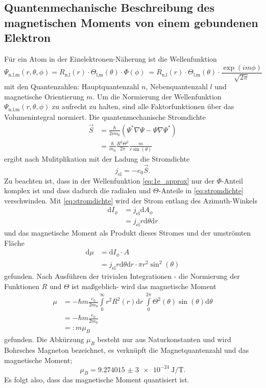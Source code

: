 \subsection{Quantenmechanische Beschreibung des magnetischen Moments von einem gebundenen Elektron}
Für ein Atom in der Einelektronen-Näherung ist die Wellenfunktion
\begin{equation}
  \Psi_\text{n,l,m}(r,\theta,\phi) = R_\text{n,l}(r)\cdot \Theta_\text{l,m}(\theta)\cdot \Phi(\phi) \
  = R_\text{n,l}(r)\cdot \Theta_\text{l,m}(\theta)\cdot \frac{\exp\left(im\phi\right)}{\sqrt{2\pi}}
  \label{eq:1e_approx}
\end{equation}
mit den Quantenzahlen: Hauptquantenzahl $n$, Nebenquantenzahl $l$ und
magnetische Orientierung $m$.
Um die Normierung der Wellenfunktion $\Psi_\text{n,l,m}(r,\theta,\phi)$ zu aufrecht zu halten,
sind alle Faktorfunktionen über das Volumenintegral normiert.
Die quantenmechanische Stromdichte
\begin{align}
  \vec{S}&=\frac{\hbar}{2im_0}(\Psi^{*}\nabla\Psi - \Psi\nabla\Psi^{*})\\
          &=\frac{\hbar}{m_0}\frac{R^2\Theta^2}{2\pi}\frac{m}{r\sin(\theta)}
        \label{eq:stromdichte}
\end{align}
ergibt nach Mulitplikation mit der Ladung die Stromdichte
\begin{equation}
  j_\text{el}= - e_0 \vec{S}.
  \label{eq:stromdichte2}
\end{equation}
Zu beachten ist, dass in der Wellenfunktion \eqref{eq:1e_approx} nur der $\Phi$-Anteil
komplex ist und dass dadurch die radialen und $\Theta$-Anteile in \eqref{eq:stromdichte}
verschwinden.
Mit \eqref{eq:stromdichte} wird der Strom entlang des Azimuth-Winkels
\begin{align}
  \mathup{d}I_\phi &= j_\text{el} \mathup{d}A_\phi\\
          &= j_\text{el} r \mathup{d}\theta \mathup{d}r
\end{align}
und das magnetische Moment als Produkt dieses Stromes und der umströmten Fläche
\begin{align}
  \mathup{d}\mu&=\mathup{d}I_\phi \cdot A\\
            &=j_\text{el} r \mathup{d}\theta \mathup{d}r \cdot \pi r^2\sin^2(\theta)
\end{align}
gefunden.
Nach Ausführen der trivialen Integrationen - die Normierung der Funktionen $R$ und $\Theta$ ist maßgeblich-
wird das magnetische Moment
\begin{align}
  \mu&=-\hbar m \frac{e_0}{2m_0}\int\limits_0^\infty r^2 R^2(r)\mathup{d}r \
  \int\limits_0^{2\pi} \Theta^2(\theta)\sin(\theta)\mathup{d}\theta\\
      &=-\hbar m \frac{e_0}{2m_0}\\
      &=: m \mu_B
\end{align}
gefunden.
Die Abkürzung $\mu_B$ besteht nur aus Naturkonstanten und wird Bohrsches
Magneton bezeichnet, es verknüpft die Magnetquantenzahl und das magnetische Moment;
\begin{equation}
  \mu_B = \SI{9,274015(3)e-24}{\joule\per\tesla}.
  \label{eq:bohrmag}
\end{equation}
Es folgt also, dass das magnetische Moment quantisiert ist.
